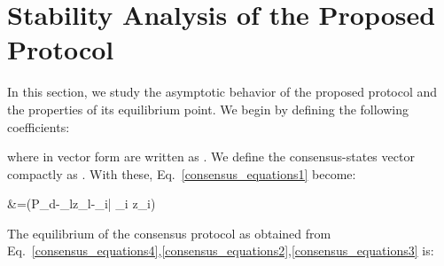 \documentclass[letterpaper, 10 pt, conference]{ieeeconf}
\begin{document}
\section{Stability Analysis of the Proposed Protocol}
In this section, we study the asymptotic behavior of the proposed protocol and the properties of its equilibrium point. We begin by defining the following coefficients:

 where in vector form are written as .  We define the consensus-states vector compactly as . With these, Eq.~\eqref{consensus_equations1} become:

&=(P_d-\alpha_lz_l-\sum_{i\in\bar{}} \alpha_i z_i)\label{consensus_equations4}

The equilibrium of the consensus protocol as obtained from Eq.~\eqref{consensus_equations4},\eqref{consensus_equations2},\eqref{consensus_equations3} is:
 
\end{document}
